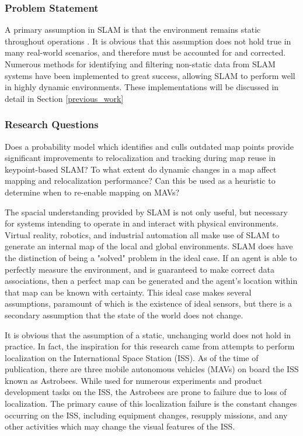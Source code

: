 
\subsubsection{Problem Statement}

A primary assumption in SLAM is that the environment remains static throughout operations \cite{PLACEHOLDER}. It is obvious that this assumption does not hold true in many real-world scenarios, and therefore must be accounted for and corrected. Numerous methods for identifying and filtering non-static data from SLAM systems have been implemented to great success, allowing SLAM to perform well in highly dynamic environments. These implementations will be discussed in detail in Section \ref{previous_work}

\subsubsection{Research Questions}

Does a probability model which identifies and culls outdated map points provide significant improvements to relocalization and tracking during map reuse in keypoint-based SLAM?
To what extent do dynamic changes in a map affect mapping and relocalization performance?
Can this be used as a heuristic to determine when to re-enable mapping on MAVs?

The spacial understanding provided by SLAM is not only useful, but necessary for systems intending to operate in and interact with physical environments. Virtual reality, robotics, and industrial automation all make use of SLAM to generate an internal map of the local and global environments. SLAM does have the distinction of being a "solved" problem in the ideal case. If an agent is able to perfectly measure the environment, and is guaranteed to make correct data associations, then a perfect map can be generated and the agent's location within that map can be known with certainty. This ideal case makes several assumptions, paramount of which is the existence of ideal sensors, but there is a secondary assumption that the state of the world does not change.

It is obvious that the assumption of a static, unchanging world does not hold in practice. In fact, the inspiration for this research came from attempts to perform localization on the International Space Station (ISS). As of the time of publication, there are three mobile autonomous vehicles (MAVs) on board the ISS known as Astrobees. While used for numerous experiments and product development tasks on the ISS, the Astrobees are prone to failure due to loss of localization. The primary cause of this localization failure is the constant changes occurring on the ISS, including equipment changes, resupply missions, and any other activities which may change the visual features of the ISS.


